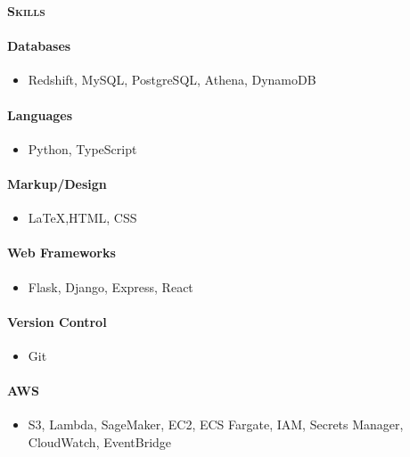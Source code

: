 \documentclass[11pt, a4paper]{article}
\newcommand{\headleft}[1]{\vspace*{3ex}\textsc{\textbf{#1}}\par%
    \vspace*{-1.5ex}\hrulefill\par\vspace*{0.7ex}}
\begin{document}
\begin{minipage}[t]{0.33\textwidth}
{\begin{minipage}[t][293mm][t]{0.82\textwidth}
\headleft{Skills}
\vspace{-20pt}
\paragraph[*]{Databases}
\begin{itemize}
\item Redshift, MySQL, PostgreSQL, Athena, DynamoDB
\end{itemize} 
\vspace{-18pt}
\paragraph[*]{Languages}
\begin{itemize}
\item Python, TypeScript
\end{itemize} 
\vspace{-18pt}
\paragraph[*]{Markup/Design}
\begin{itemize}
\item \LaTeX ,HTML, CSS
\end{itemize}
\vspace{-18pt}
\paragraph[*]{Web Frameworks}
\begin{itemize}
\item Flask, Django, Express, React
\end{itemize}
\vspace{-18pt}
\paragraph[*]{Version Control}
\begin{itemize}
\item Git
\end{itemize} 
\vspace{-18pt}
\paragraph[*]{AWS}
\begin{itemize}
\item S3, Lambda, SageMaker, EC2, ECS Fargate, IAM, Secrets Manager, CloudWatch, EventBridge
\end{itemize}
\vspace{-18pt}

\end{minipage}}
\end{minipage}
\end{document}

